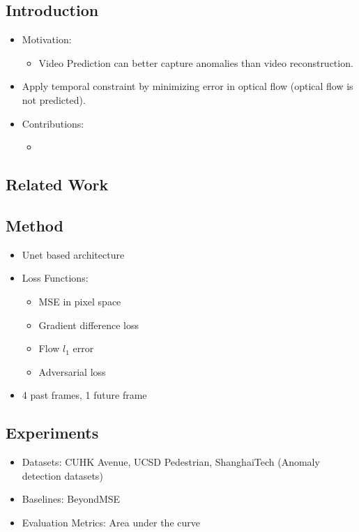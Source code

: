 \documentclass{article}
\begin{document}
    \subsection{Introduction}\label{subsec:Future_Frame_Prediction_for_Anomaly_Detection_A_New_Baseline:introduction}
    \begin{itemize}
        \item Motivation:
        \begin{itemize}
            \item Video Prediction can better capture anomalies than video reconstruction.
        \end{itemize}
        \item Apply temporal constraint by minimizing error in optical flow (optical flow is not predicted).
        \item Contributions:
        \begin{itemize}
            \item
        \end{itemize}
    \end{itemize}

    \subsection{Related Work}\label{subsec:Future_Frame_Prediction_for_Anomaly_Detection_A_New_Baseline:related-work}

    \subsection{Method}\label{subsec:Future_Frame_Prediction_for_Anomaly_Detection_A_New_Baseline:method}
    \begin{itemize}
        \item Unet based architecture
        \item Loss Functions:
        \begin{itemize}
            \item MSE in pixel space
            \item Gradient difference loss
            \item Flow $l_1$ error
            \item Adversarial loss
        \end{itemize}
        \item 4 past frames, 1 future frame
    \end{itemize}

    \subsection{Experiments}\label{subsec:Future_Frame_Prediction_for_Anomaly_Detection_A_New_Baseline:experiments}
    \begin{itemize}
        \item Datasets: CUHK Avenue, UCSD Pedestrian, ShanghaiTech (Anomaly detection datasets)
        \item Baselines: BeyondMSE
        \item Evaluation Metrics: Area under the curve
    \end{itemize}
    \newpage
\end{document}
